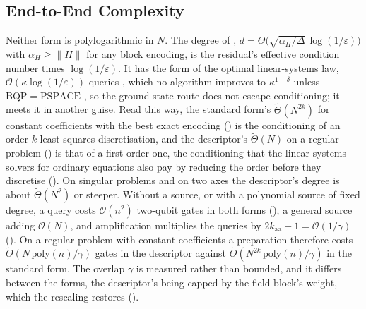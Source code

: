 \subsection{End-to-End Complexity}
\label{sec:disc-complexity}

Neither form is polylogarithmic in $N$. The degree of , $d=\Theta\bigl(\sqrt{\alpha_H/\Delta}\,\log(1/\varepsilon)\bigr)$ with $\alpha_H\ge\|H\|$ for any block encoding, is the residual's effective condition number times $\log(1/\varepsilon)$. It has the form of the optimal linear-systems law, $\mathcal O(\kappa\log(1/\varepsilon))$ queries \cite{costa2022optimal}, which no algorithm improves to $\kappa^{1-\delta}$ unless $\mathrm{BQP}=\mathrm{PSPACE}$ \cite{harrow2009hhl}, so the ground-state route does not escape conditioning; it meets it in another guise. Read this way, the standard form's $\tilde\Theta(N^{2k})$ for constant coefficients with the best exact encoding () is the conditioning of an order-$k$ least-squares discretisation, and the descriptor's $\tilde\Theta(N)$ on a regular problem () is that of a first-order one, the conditioning that the linear-systems solvers for ordinary equations also pay by reducing the order before they discretise (). On singular problems and on two axes the descriptor's degree is about $\tilde\Theta(N^2)$ or steeper. Without a source, or with a polynomial source of fixed degree, a query costs $\mathcal O(n^2)$ two-qubit gates in both forms (), a general source adding $\mathcal O(N)$, and amplification multiplies the queries by $2k_{\mathrm{aa}}+1=\mathcal O(1/\gamma)$ (). On a regular problem with constant coefficients a preparation therefore costs $\tilde\Theta(N\,\mathrm{poly}(n)/\gamma)$ gates in the descriptor against $\tilde\Theta(N^{2k}\,\mathrm{poly}(n)/\gamma)$ in the standard form. The overlap $\gamma$ is measured rather than bounded, and it differs between the forms, the descriptor's being capped by the field block's weight, which the rescaling restores ().

